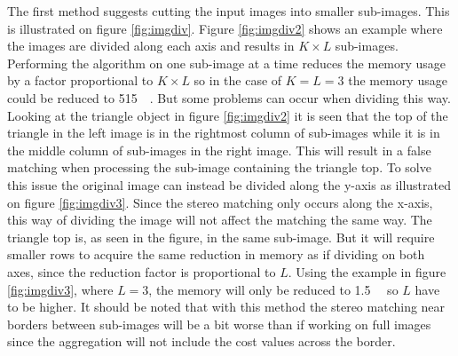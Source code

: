 The first method suggests cutting the input images into smaller sub-images. This is illustrated on figure \vref{fig:imgdiv}. Figure \vref{fig:imgdiv2} shows an example where the images are divided along each axis and results in $K \times L$ sub-images. Performing the algorithm on one sub-image at a time reduces the memory usage by a factor proportional to $K \times L$ so in the case of $K = L = 3$ the memory usage could be reduced to \SI{515}{\mega\byte}. But some problems can occur when dividing this way. Looking at the triangle object in figure \vref{fig:imgdiv2} it is seen that the top of the triangle in the left image is in the rightmost column of sub-images while it is in the middle column of sub-images in the right image. This will result in a false matching when processing the sub-image containing the triangle top. To solve this issue the original image can instead be divided along the y-axis as illustrated on figure \vref{fig:imgdiv3}. Since the stereo matching only occurs along the x-axis, this way of dividing the image will not affect the matching the same way. The triangle top is, as seen in the figure, in the same sub-image. But it will require smaller rows to acquire the same reduction in memory as if dividing on both axes, since the reduction factor is proportional to $L$. Using the example in figure \vref{fig:imgdiv3}, where $L=3$, the memory will only be reduced to \SI{1.5}{\giga\byte} so $L$ have to be higher. It should be noted that with this method the stereo matching near borders between sub-images will be a bit worse than if working on full images since the aggregation will not include the cost values across the border. \\

